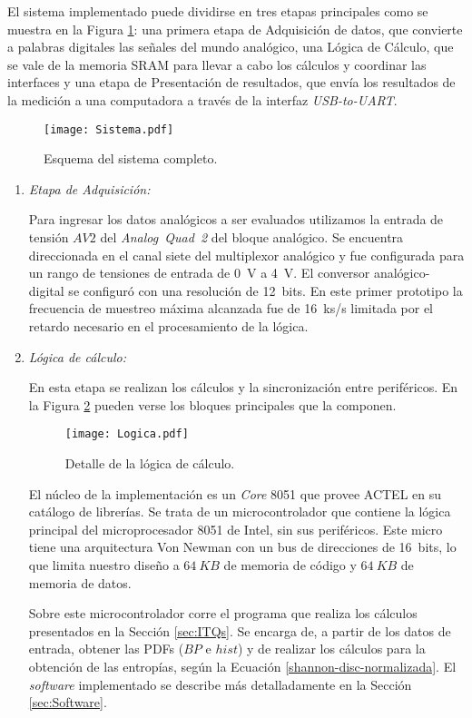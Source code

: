 El sistema implementado puede dividirse en tres etapas principales como se muestra en la Figura \ref{Fig:Sistema}: una primera etapa de Adquisición de datos, que convierte a palabras digitales las señales del mundo analógico, una Lógica de Cálculo, que se vale de la memoria SRAM para llevar a cabo los cálculos y coordinar las interfaces y una etapa de Presentación de resultados, que envía los resultados de la medición a una computadora a través de la interfaz \textit{USB-to-UART}.
%
\begin{figure}
	\centering
	\texttt{[image: Sistema.pdf]}\\
	\caption{Esquema del sistema completo.}\label{Fig:Sistema}
\end{figure}

\begin{enumerate}
	\item \textit{Etapa de Adquisición:}
	
	Para ingresar los datos analógicos a ser evaluados utilizamos la entrada de tensión $AV2$ del \textit{Analog~Quad~2} del bloque analógico.
	Se encuentra direccionada en el canal siete del multiplexor analógico y fue configurada para un rango de tensiones de entrada de 0~V a 4~V.
	El conversor analógico-digital se configuró con una resolución de 12~bits.
	En este primer prototipo la frecuencia de muestreo máxima alcanzada fue de 16~ks/s limitada por el retardo necesario en el procesamiento de la lógica.
	
	\item \textit{Lógica de cálculo:}
	
	En esta etapa se realizan los cálculos y la sincronización entre periféricos.
	En la Figura \ref{fig:logica} pueden verse los bloques principales que la componen.
	\begin{figure}
		\centering
		\texttt{[image: Logica.pdf]}\\
		\caption{Detalle de la lógica de cálculo.}\label{fig:logica}
	\end{figure}
	
	El núcleo de la implementación es un \textit{Core} 8051 que provee ACTEL en su catálogo de librerías.
	Se trata de un microcontrolador que contiene la lógica principal del microprocesador 8051 de Intel, sin sus periféricos.
	Este micro tiene una arquitectura Von Newman con un bus de direcciones de 16~bits, lo que limita nuestro diseño a $64~KB$ de memoria de código y $64~KB$ de memoria de datos.
	
	Sobre este microcontrolador corre el programa que realiza los cálculos presentados en la Sección \ref{sec:ITQs}.
	Se encarga de, a partir de los datos de entrada, obtener las PDFs ($BP$ e $hist$) y de realizar los cálculos para la obtención de las entropías, según la Ecuación \ref{shannon-disc-normalizada}.
	El \textit{software} implementado se describe más detalladamente en la Sección \ref{sec:Software}.
	

\end{enumerate}
